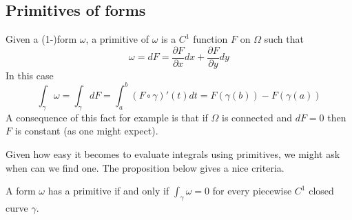 \subsection{Primitives of forms}
Given a (1-)form $\omega$, a primitive of $\omega$ is a $C^1$ function $F$ on $\Omega$ such that
$$\omega = dF = \frac{\partial F}{\partial x} dx + \frac{\partial F}{\partial y}dy $$
In this case
$$ \int_{\gamma} \omega = \int_{\gamma} dF = \int_{a}^b (F \circ \gamma)'(t) dt = F(\gamma(b)) - F(\gamma(a)) $$
A consequence of this fact for example is that if $\Omega$ is connected and $dF = 0$ then $F$ is constant (as one might expect).

Given how easy it becomes to evaluate integrals using primitives, we might ask when can we find one. The proposition below gives a nice criteria.
\begin{proposition}\label{prop:exact-equivalence}
A form $\omega$ has a primitive if and only if $\displaystyle \int_{\gamma}\omega = 0$ for every piecewise $C^1$ closed curve $\gamma$.
\end{proposition}
